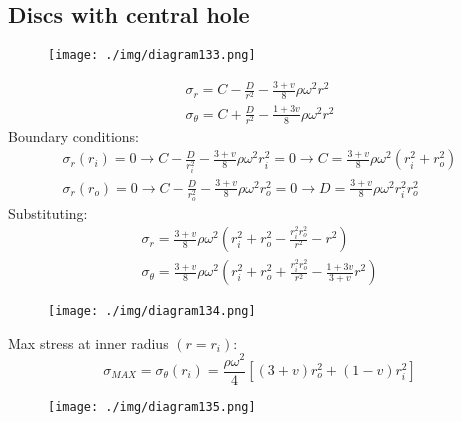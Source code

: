 \subsection{Discs with central hole}
\begin{figure}[H]
    \centering
    \texttt{[image: ./img/diagram133.png]}
    \caption{}
\end{figure}
\begin{gather}
    \sigma_r = C - \frac{D}{r^2} - \frac{3 + v}{8}\rho \omega^2 r^2\\
    \sigma_{\theta} = C + \frac{D}{r^2} - \frac{1+ 3v}{8}\rho\omega^2 r^2
\end{gather}
Boundary conditions:
\begin{gather}
    \sigma_r \left(r_i\right) = 0 \rightarrow C - \frac{D}{r_i^2} - \frac{3+v}{8} \rho \omega^2 r_i^2 = 0 \rightarrow C = \frac{3+v}{8} \rho \omega^2 \left(r_i^2 + r_o^2\right)\\
    \sigma_r \left(r_o\right) = 0 \rightarrow C - \frac{D}{r_o^2} - \frac{3+v}{8} \rho \omega^2 r_o^2 = 0 \rightarrow D = \frac{3+v}{8} \rho \omega^2 r_i^2 r_o^2
\end{gather}
Substituting:
\begin{gather}
    \sigma_r = \frac{3+v}{8} \rho \omega^2 \left(r_i^2 + r_o^2 - \frac{r_i^2 r_o^2}{r^2}-r^2\right)\\
    \sigma_{\theta} = \frac{3+v}{8}\rho \omega^2 \left(r_i^2 + r_o^2 + \frac{r_i^2 r_o^2}{r^2} - \frac{1+3v}{3+v}r^2 \right)
\end{gather}
\begin{figure}[H]
    \centering
    \texttt{[image: ./img/diagram134.png]}
    \caption{}
\end{figure}
Max stress at inner radius $\left(r = r_i\right)$:
\begin{equation}
    \sigma_{MAX} = \sigma_{\theta} \left(r_i\right) = \frac{\rho \omega^2 }{4}\left[\left(3+v\right) r_o^2 + \left(1-v\right)r_i^2\right]
\end{equation}
\begin{figure}[H]
    \centering
    \texttt{[image: ./img/diagram135.png]}
    \caption{}
\end{figure}